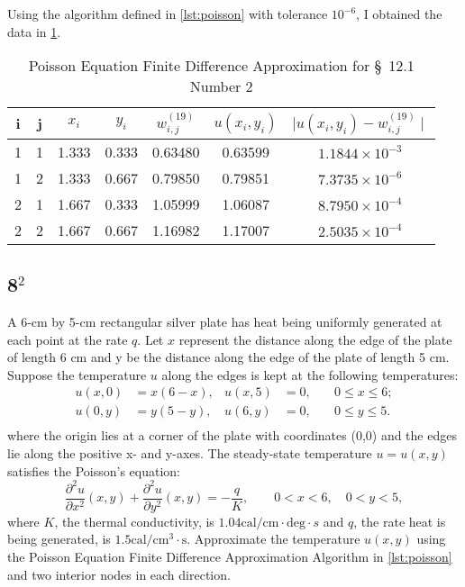 \documentclass[12pt]{article}
\begin{document}
Using the algorithm defined in \cref{lst:poisson} with tolerance
$10^{-6}$, I obtained the data in \cref{tab:2}.
\begin{table}[h]
  \centering
  \begin{tabular}{ccccccc}
      \hline
      i & j & $x_i$ & $y_i$ & $w_{i,j}^{(19)}$ & $u(x_i,y_i)$ & $\mid
      u(x_i,y_i) - w_{i,j}^{(19)}\mid$ \\
      \hline
      1 & 1 & 1.333 & 0.333 & 0.63480 & 0.63599 & $1.1844 \times 10^{-3}$ \\
      1 & 2 & 1.333 & 0.667 & 0.79850 & 0.79851 & $7.3735 \times 10^{-6}$ \\
      2 & 1 & 1.667 & 0.333 & 1.05999 & 1.06087 & $8.7950 \times 10^{-4}$ \\
      2 & 2 & 1.667 & 0.667 & 1.16982 & 1.17007 & $2.5035 \times 10^{-4}$ \\
      \hline
  \end{tabular}
  \caption{Poisson Equation Finite Difference Approximation for
    \S~12.1 Number 2}
  \label{tab:2}
\end{table}

\subsection{8$^2$}
A 6-cm by 5-cm rectangular silver plate has heat being uniformly
generated at each point at the rate
$q$. Let $x$ represent the
distance along the edge of the plate of length 6 cm and y be the
distance along the edge of the plate of length 5 cm. Suppose the
temperature $u$ along the edges is kept at the following temperatures:
\begin{equation*}
  \begin{aligned}
    u(x,0)&=x(6-x), &u(x,5)&=0,\quad &0\leq x\leq 6; \\
    u(0,y)&=y(5-y), &u(6,y)&=0,\quad &0\leq y \leq 5. \\
  \end{aligned}
\end{equation*}
where the origin lies at a corner of the plate with coordinates (0,0)
and the edges lie along the positive x- and y-axes. The steady-state
temperature $u=u(x,y)$ satisfies the Poisson's equation:
\begin{equation*}
  \frac{\partial^2u}{\partial x^2}(x,y) +
  \frac{\partial^2u}{\partial y^2}(x,y) = -\frac{q}{K}, \qquad
  0<x<6,\quad 0<y<5,
\end{equation*}
where $K$, the thermal conductivity, is $1.04 \text{
  cal}/\text{cm}\cdot \text{deg} \cdot s$ and $q$, the rate heat is
being generated, is $1.5\text{
  cal}/\text{cm}^3\cdot\text{s}$. Approximate the temperature $u(x,y)$
using the Poisson Equation Finite Difference Approximation Algorithm
in \cref{lst:poisson} and two interior nodes in each direction.
\end{document}
